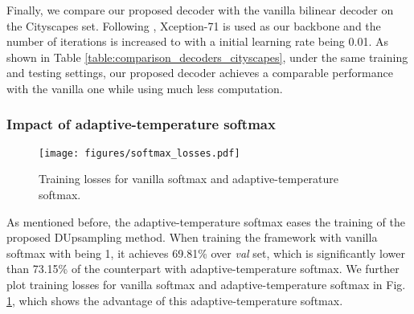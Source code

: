 \documentclass[10pt,twocolumn,letterpaper]{article}
\newcommand{\1}{{\mathbbm{1}}}
\begin{document}
Finally, we compare our proposed decoder with the vanilla bilinear decoder on the Cityscapes  set. Following \cite{chen2018encoder}, Xception-71 is used as our backbone and the number of iterations is increased to  with a initial learning rate being 0.01. As shown in Table \ref{table:comparison_decoders_cityscapes}, under the same training and testing settings, our proposed decoder achieves a comparable performance with the vanilla one while using much less  computation.
\subsubsection{Impact of adaptive-temperature softmax} \label{section:temperature_softmax}
\begin{figure}[ht!]
  \centering
  \texttt{[image: figures/softmax\_losses.pdf]}
  \caption{Training losses for vanilla softmax and adaptive-temperature softmax.}
  \label{fig:softmax_losses}
\end{figure}




As mentioned before, the adaptive-temperature softmax eases the training of the proposed DUpsampling method. When training the framework with vanilla softmax with  being 1, it achieves 69.81\% over {\it val} set, which is significantly lower than 73.15\% of the counterpart with adaptive-temperature softmax. We further plot training losses for vanilla softmax and adaptive-temperature softmax in Fig. \ref{fig:softmax_losses}, which shows the advantage of this adaptive-temperature softmax.
\end{document}
